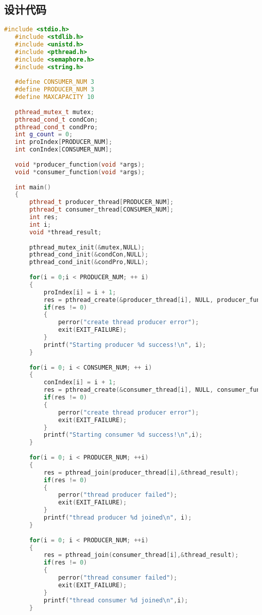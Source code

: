 \documentclass[withoutpreface,bwprint]{cumcmthesis} %
\begin{document}
\begin{appendices}
\section{设计代码}
\begin{lstlisting}[language=c++]
   #include <stdio.h>
   #include <stdlib.h>
   #include <unistd.h>
   #include <pthread.h>
   #include <semaphore.h>
   #include <string.h>
    
   #define CONSUMER_NUM 3
   #define PRODUCER_NUM 3
   #define MAXCAPACITY 10
    
   pthread_mutex_t mutex;
   pthread_cond_t condCon;
   pthread_cond_t condPro;
   int g_count = 0;
   int proIndex[PRODUCER_NUM];
   int conIndex[CONSUMER_NUM];
    
   void *producer_function(void *args);
   void *consumer_function(void *args);
    
   int main()
   {
       pthread_t producer_thread[PRODUCER_NUM];
       pthread_t consumer_thread[CONSUMER_NUM];
       int res;
       int i;
       void *thread_result;
    
       pthread_mutex_init(&mutex,NULL);
       pthread_cond_init(&condCon,NULL);
       pthread_cond_init(&condPro,NULL);
    
       for(i = 0;i < PRODUCER_NUM; ++ i)
       {
           proIndex[i] = i + 1;
           res = pthread_create(&producer_thread[i], NULL, producer_function, (void*)&proIndex[i]);
           if(res != 0)
           {
               perror("create thread producer error");
               exit(EXIT_FAILURE);
           }
           printf("Starting producer %d success!\n", i);
       }
    
       for(i = 0; i < CONSUMER_NUM; ++ i)
       {
           conIndex[i] = i + 1;
           res = pthread_create(&consumer_thread[i], NULL, consumer_function, (void*)&conIndex[i]);
           if(res != 0)
           {
               perror("create thread producer error");
               exit(EXIT_FAILURE);
           }
           printf("Starting consumer %d success!\n",i);
       }
    
       for(i = 0; i < PRODUCER_NUM; ++i)
       {
           res = pthread_join(producer_thread[i],&thread_result);
           if(res != 0)
           {
               perror("thread producer failed");
               exit(EXIT_FAILURE);
           }
           printf("thread producer %d joined\n", i);
       }
    
       for(i = 0; i < PRODUCER_NUM; ++i)
       {
           res = pthread_join(consumer_thread[i],&thread_result);
           if(res != 0)
           {
               perror("thread consumer failed");
               exit(EXIT_FAILURE);
           }
           printf("thread consumer %d joined\n",i);
       }
    

\end{lstlisting}
\end{appendices}
\end{document}
